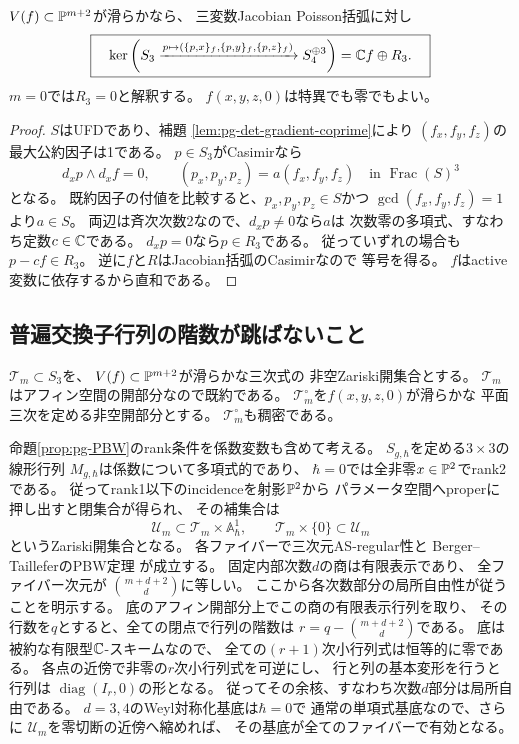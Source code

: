 \begin{lemma}[全三次式の古典的Casimir核]
\label{lem:pg-det-classical-kernel}
$V(f)\subset\mathbb P^{m+2}$が滑らかなら、
三変数Jacobian Poisson括弧に対し
\begin{equation}
 \boxed{\quad
 \ker\left(S_3\xrightarrow{p\mapsto
 (\{p,x\}_f,\{p,y\}_f,\{p,z\}_f)}
 S_4^{\oplus3}\right)
 =\mathbb C f\oplus R_3.
 \quad}
 \label{eq:pg-det-classical-kernel}
\end{equation}
$m=0$では$R_3=0$と解釈する。
$f(x,y,z,0)$は特異でも零でもよい。
\end{lemma}
\begin{proof}
$S$はUFDであり、補題
\ref{lem:pg-det-gradient-coprime}により
$(f_x,f_y,f_z)$の最大公約因子は1である。
$p\in S_3$がCasimirなら
\begin{equation}
 d_xp\wedge d_xf=0,
 \qquad
 (p_x,p_y,p_z)=a(f_x,f_y,f_z)
 \quad\text{in }\operatorname{Frac}(S)^3
 \label{eq:pg-det-casimir-proportional}
\end{equation}
となる。
既約因子の付値を比較すると、$p_x,p_y,p_z\in S$かつ
$\gcd(f_x,f_y,f_z)=1$より$a\in S$。
両辺は斉次次数2なので、$d_xp\ne0$なら$a$は
次数零の多項式、すなわち定数$c\in\mathbb C$である。
$d_xp=0$なら$p\in R_3$である。
従っていずれの場合も$p-cf\in R_3$。
逆に$f$と$R$はJacobian括弧のCasimirなので
等号を得る。
$f$はactive変数に依存するから直和である。
\end{proof}

\subsection{普遍交換子行列の階数が跳ばないこと}
$\mathcal T_m\subset S_3$を、
$V(f)\subset\mathbb P^{m+2}$が滑らかな三次式の
非空Zariski開集合とする。
$\mathcal T_m$はアフィン空間の開部分なので既約である。
$\mathcal T_m^\circ$を$f(x,y,z,0)$が滑らかな
平面三次を定める非空開部分とする。
$\mathcal T_m^\circ$も稠密である。

命題\ref{prop:pg-PBW}のrank条件を係数変数も含めて考える。
$S_{g,\hbar}$を定める$3\times3$の線形行列
$M_{g,\hbar}$は係数について多項式的であり、
$\hbar=0$では全非零$x\in\mathbb P^2$でrank2である。
従ってrank1以下のincidenceを射影$\mathbb P^2$から
パラメータ空間へproperに押し出すと閉集合が得られ、
その補集合は
\begin{equation}
 \mathcal U_m\subset\mathcal T_m\times\mathbb A^1_\hbar,
 \qquad
 \mathcal T_m\times\{0\}\subset\mathcal U_m
 \label{eq:pg-det-universal-open}
\end{equation}
というZariski開集合となる。
各ファイバーで三次元AS-regular性と
Berger--TailleferのPBW定理
\cite{PMoriSmith,PBergerTaillefer}が成立する。
固定内部次数$d$の商は有限表示であり、
全ファイバー次元が
$\binom{m+d+2}{d}$に等しい。
ここから各次数部分の局所自由性が従うことを明示する。
底のアフィン開部分上でこの商の有限表示行列を取り、
その行数を$q$とすると、全ての閉点で行列の階数は
$r=q-\binom{m+d+2}{d}$である。
底は被約な有限型$\mathbb C$-スキームなので、
全ての$(r+1)$次小行列式は恒等的に零である。
各点の近傍で非零の$r$次小行列式を可逆にし、
行と列の基本変形を行うと行列は
$\operatorname{diag}(I_r,0)$の形となる。
従ってその余核、すなわち次数$d$部分は局所自由である。
$d=3,4$のWeyl対称化基底は$\hbar=0$で
通常の単項式基底なので、さらに
$\mathcal U_m$を零切断の近傍へ縮めれば、
その基底が全てのファイバーで有効となる。

